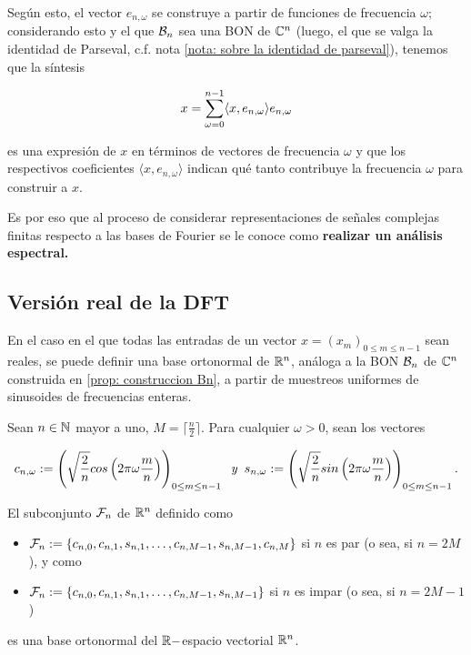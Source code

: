 Según esto, el vector $e_{n,\omega}$ se construye a partir
de funciones de frecuencia $\omega$; considerando esto
y el que $\mathcal{B}_{n}$ sea una BON de $\mathbb{C}^{n}$ (luego, el
que se valga la identidad de Parseval,
c.f. nota \ref{nota: sobre la identidad de parseval}), tenemos que
la síntesis

\[
x = \sum\limits_{\omega=0}^{n-1}\langle x, e_{n,\omega} \rangle e_{n,\omega}
\]

\noindent
es una expresión de $x$ en términos de vectores de frecuencia
$\omega$ y que los respectivos coeficientes 
$\langle x, e_{n,\omega} \rangle$ indican qué tanto 
contribuye la frecuencia $\omega$ para construir a $x$.

Es por eso que al proceso de considerar representaciones
de señales complejas finitas respecto a las bases de Fourier
se le conoce como  
\textbf{realizar un análisis espectral.}


\subsection{Versión real de la DFT}

En el caso en el que todas las entradas de un vector
$x = (x_{m})_{0 \leq m \leq n-1}$ sean reales, se puede definir
una base ortonormal de $\mathbb{R}^{n}$, 
análoga a la BON $\mathcal{B}_{n}$ de $\mathbb{C}^{n}$ construida en 
\ref{prop: construccion Bn},
a partir de muestreos uniformes
de sinusoides de frecuencias enteras.

\begin{prop}
\label{prop: base de fourier version real}
Sean $n \in \mathbb{N}$ mayor a uno, $M = \lceil \frac{n}{2} \rceil$.
Para cualquier $\omega >0$, sean los vectores 

	\begin{equation}
	\label{eq0: 10ab}
	c_{n, \omega} := \left( \sqrt{\frac{2}{n}} cos
	\left(2 \pi \omega \frac{m}{n}
	\right) \right)_{0 \leq m \leq n-1}
	\hspace{0.2cm} \textit{y} \hspace{0.2cm} 
	s_{n, \omega} := \left( \sqrt{\frac{2}{n}} sin
	\left(2 \pi \omega \frac{m}{n}
	\right) \right)_{0 \leq m \leq n-1}.
	\end{equation}

El subconjunto $\mathcal{F}_{n}$ de $\mathbb{R}^{n}$ definido como

	\begin{itemize}
	\item $\mathcal{F}_{n} : = \{ c_{n,0}, c_{n,1}, s_{n,1},
	\ldots , c_{n,M-1}, s_{n,M-1}, c_{n,M} \}$ si $n$ es par
	(o sea, si $n=2M$), y como
	\item $\mathcal{F}_{n} : = \{ c_{n,0}, c_{n,1}, s_{n,1},
	\ldots , c_{n,M-1}, s_{n,M-1} \}$ si $n$ es impar
	(o sea, si $n=2M-1$)
	\end{itemize}
	
es una base ortonormal del $\mathbb{R}-$espacio vectorial $\mathbb{R}^{n}$.
\end{prop}

